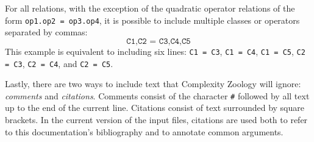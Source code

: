 \documentclass[12pt]{amsart}
\theoremstyle{definition}
\theoremstyle{remark}
\begin{document}
For all relations, with the exception of the quadratic operator relations of the
form \texttt{op1.op2 = op3.op4}, it is possible to include multiple classes or
operators separated by commas:
\[
\texttt{C1,C2 = C3,C4,C5}
\]
This example is equivalent to including six lines: \texttt{C1 = C3},
\texttt{C1 = C4}, \texttt{C1 = C5}, \texttt{C2 = C3}, \texttt{C2 = C4}, and
\texttt{C2 = C5}.

Lastly, there are two ways to include text that Complexity Zoology will ignore:
\textit{comments} and \textit{citations}. Comments consist of the character
\texttt{\#} followed by all text up to the end of the current line. Citations
consist of text surrounded by square brackets. In the current version of the
input files, citations are used both to refer to this documentation's
bibliography and to annotate common arguments.
\end{document}
